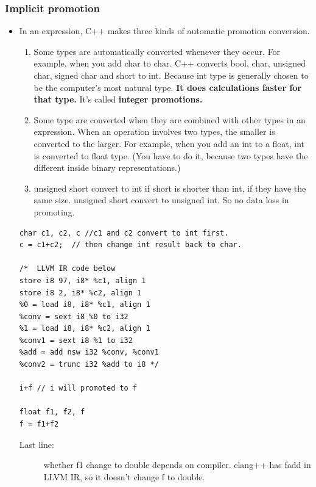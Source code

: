 \documentclass[a4paper,11pt,twoside]{book}
\begin{document}
\subsubsection{Implicit promotion}
\begin{itemize}
\item In an expression, C++ makes three kinds of automatic promotion conversion.
\begin{enumerate}
	\item Some types are automatically converted whenever they occur. For example, when you add char to char. C++ converts bool, char, unsigned char, signed char and short to int. Because int type is generally chosen to be the computer's most natural type. \textbf{It does calculations faster for that type.} It's called \textbf{integer promotions.}
	
	\item Some type are converted when they are combined with other types in an expression. When an operation involves two types, the smaller is converted to the larger. For example, when you add an int to a float, int is converted to float type. (You have to do it, because two types have the different inside binary representations.)
	
	\item unsigned short convert to int if short is shorter than int, if they have the same size. unsigned short convert to unsigned int.  So no data loss in promoting.
\end{enumerate}



\begin{lstlisting}
char c1, c2, c //c1 and c2 convert to int first.
c = c1+c2;  // then change int result back to char.
	
/*  LLVM IR code below
store i8 97, i8* %c1, align 1
store i8 2, i8* %c2, align 1
%0 = load i8, i8* %c1, align 1
%conv = sext i8 %0 to i32
%1 = load i8, i8* %c2, align 1
%conv1 = sext i8 %1 to i32
%add = add nsw i32 %conv, %conv1
%conv2 = trunc i32 %add to i8 */
	
i+f // i will promoted to f
	
float f1, f2, f
f = f1+f2 
\end{lstlisting}

\begin{description}
	\item[Last line:] whether f1 change to double depends on compiler. clang++ has fadd in LLVM IR, so it doesn't change f to double.
\end{description}

\end{itemize}
\end{document}
